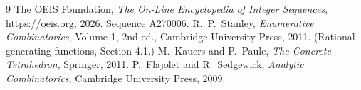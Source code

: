 \documentclass[11pt,a4paper]{article}
\theoremstyle{plain}
\theoremstyle{definition}
\begin{document}
\begin{thebibliography}{9}
 The OEIS Foundation, \emph{The On-Line Encyclopedia of Integer
Sequences}, \url{https://oeis.org}, 2026. Sequence A270006.
 R.~P.~Stanley, \emph{Enumerative Combinatorics}, Volume 1, 2nd ed.,
Cambridge University Press, 2011. (Rational generating functions, Section 4.1.)
 M.~Kauers and P.~Paule, \emph{The Concrete Tetrahedron}, Springer, 2011.
 P.~Flajolet and R.~Sedgewick, \emph{Analytic Combinatorics}, Cambridge
University Press, 2009.
\end{thebibliography}
\end{document}
